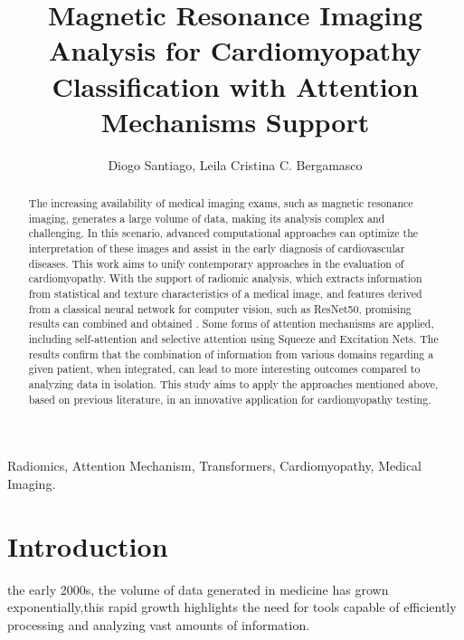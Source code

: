 \documentclass[journal,twoside,web]{ieeecolor}
\begin{document}
\title{Magnetic Resonance Imaging Analysis for Cardiomyopathy Classification with Attention Mechanisms Support}

\author{
  Diogo Santiago, Leila Cristina C. Bergamasco
   
}


\maketitle

\begin{abstract}
The increasing availability of medical imaging exams, such as magnetic resonance imaging, generates a large volume of data, making its analysis complex and challenging. In this scenario, advanced computational approaches can optimize the interpretation of these images and assist in the early diagnosis of cardiovascular diseases. This work aims to unify contemporary approaches in the evaluation of cardiomyopathy. 
With the support of radiomic analysis, which extracts information from statistical and texture characteristics of a medical image, and features derived from a classical neural network for computer vision, such as ResNet50, promising results can combined and obtained \cite{heDeepResidualLearning2015}. Some forms of attention mechanisms are applied, including self-attention and selective attention using Squeeze and Excitation Nets.  The results confirm that the combination of information from various domains regarding a given patient, when integrated, can lead to more interesting outcomes compared to analyzing data in isolation. This study aims to apply the approaches mentioned above, based on previous literature, in an innovative application for cardiomyopathy testing.
\end{abstract}

\begin{IEEEkeywords}
Radiomics, Attention Mechanism, Transformers, Cardiomyopathy, Medical Imaging.
\end{IEEEkeywords}

\section{Introduction}
\label{sec:introduction}
 the early 2000s, the volume of data generated in medicine has grown exponentially,this rapid growth highlights the need for tools capable of efficiently processing and analyzing vast amounts of information.
\end{document}
